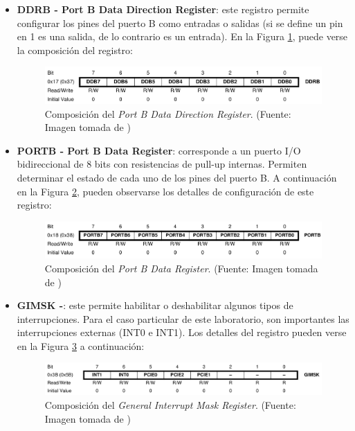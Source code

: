 \begin{itemize}
    \item \textbf{DDRB - Port B Data Direction Register}: este registro permite configurar los pines del puerto B como entradas o salidas (si se define un pin en 1 es una salida, de lo contrario es un entrada). En la Figura \ref{fig:DDRB}, puede verse la composición del registro: 
  
    \begin{figure}[H]
    \centering
    \includegraphics[width=150mm]{./Figuras/Nota_teorica/DDRB}
    \caption{Composición del \textit{Port B Data Direction Register}. (Fuente: Imagen tomada de \cite{AT})}
    \label{fig:DDRB}
    \end{figure}

    \item \textbf{PORTB - Port B Data Register}: corresponde a un puerto I/O bidireccional de 8 bits con resistencias de pull-up internas. Permiten determinar el estado de cada uno de los pines del puerto B. A continuación en la Figura \ref{fig:PORTB}, pueden observarse los detalles de configuración de este registro: 

    \begin{figure}[H]
    \centering
    \includegraphics[width=150mm]{./Figuras/Nota_teorica/PORTB}
    \caption{Composición del \textit{Port B Data Register}. (Fuente: Imagen tomada de \cite{AT})}
    \label{fig:PORTB}
    \end{figure}
    
    \item \textbf{GIMSK -}: este permite habilitar o deshabilitar algunos tipos de interrupciones. Para el caso particular de este laboratorio, son importantes las interrupciones externas (INT0 e INT1). Los detalles del registro pueden verse en la Figura \ref{fig:GIMSK} a continuación: 

    \begin{figure}[H]
    \centering
    \includegraphics[width=150mm]{./Figuras/Nota_teorica/GIMSK}
    \caption{Composición del \textit{General Interrupt Mask Register}. (Fuente: Imagen tomada de \cite{AT})}
    \label{fig:GIMSK}
    \end{figure}
    

\end{itemize}
